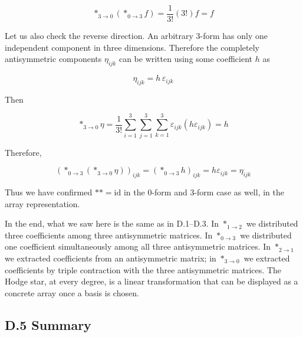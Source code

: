\[
\ast_{3\to0}(\ast_{0\to3}f)
=
\frac{1}{3!}(3!)f
=
f
\]

Let us also check the reverse direction. An arbitrary \(3\)-form has
only one independent component in three dimensions. Therefore the
completely antisymmetric components \(\eta_{ijk}\) can be written using
some coefficient \(h\) as

\[
\eta_{ijk}
=
h\,\varepsilon_{ijk}
\]

Then

\[
\ast_{3\to0}\eta
=
\frac{1}{3!}
\sum_{i=1}^{3}
\sum_{j=1}^{3}
\sum_{k=1}^{3}
\varepsilon_{ijk}(h\varepsilon_{ijk})
=
h
\]

Therefore,

\[
(\ast_{0\to3}(\ast_{3\to0}\eta))_{ijk}
=
(\ast_{0\to3}h)_{ijk}
=
h\varepsilon_{ijk}
=
\eta_{ijk}
\]

Thus we have confirmed \(\ast\ast=\mathrm{id}\) in the \(0\)-form and
\(3\)-form case as well, in the array representation.

In the end, what we saw here is the same as in D.1--D.3. In
\(\ast_{1\to2}\) we distributed three coefficients among three
antisymmetric matrices. In \(\ast_{0\to3}\) we distributed one
coefficient simultaneously among all three antisymmetric matrices. In
\(\ast_{2\to1}\) we extracted coefficients from an antisymmetric matrix;
in \(\ast_{3\to0}\) we extracted coefficients by triple contraction with
the three antisymmetric matrices. The Hodge star, at every degree, is a
linear transformation that can be displayed as a concrete array once a
basis is chosen.

\hypertarget{d.5-summary}{%
\subsection{D.5 Summary}\label{d.5-summary}}


